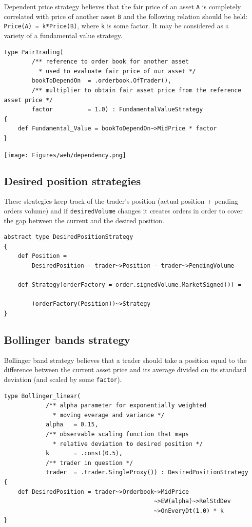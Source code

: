 \documentclass[a4paper,11pt]{article}
\begin{document}
Dependent price strategy believes that the fair price of an asset
\texttt{A} is completely correlated with price of another asset
\texttt{B} and the following relation should be held:
\texttt{Price(A) = k*Price(B)}, where \texttt{k} is some factor. It may
be considered as a variety of a fundamental value strategy.

\begin{verbatim}
type PairTrading(
        /** reference to order book for another asset
          * used to evaluate fair price of our asset */
        bookToDependOn  = .orderbook.OfTrader(),
        /** multiplier to obtain fair asset price from the reference asset price */
        factor          = 1.0) : FundamentalValueStrategy
{
    def Fundamental_Value = bookToDependOn~>MidPrice * factor
}
\end{verbatim}

\centerline{\texttt{[image: Figures/web/dependency.png]}}

\subsection{Desired position
strategies}\label{desired-position-strategies}

These strategies keep track of the trader's position (actual position +
pending orders volume) and if \texttt{desiredVolume} changes it creates
orders in order to cover the gap between the current and the desired
position.

\begin{verbatim}
abstract type DesiredPositionStrategy
{
    def Position = 
        DesiredPosition - trader~>Position - trader~>PendingVolume

    def Strategy(orderFactory = order.signedVolume.MarketSigned()) =
    
        (orderFactory(Position))~>Strategy
}
\end{verbatim}

\subsection{Bollinger bands strategy}\label{bollinger-bands-strategy}

Bollinger band strategy believes that a trader should take a position
equal to the difference between the current asset price and its average
divided on its standard deviation (and scaled by some \texttt{factor}).

\begin{verbatim}
type Bollinger_linear(
            /** alpha parameter for exponentially weighted
              * moving everage and variance */
            alpha   = 0.15,
            /** observable scaling function that maps
              * relative deviation to desired position */
            k       = .const(0.5),
            /** trader in question */
            trader  = .trader.SingleProxy()) : DesiredPositionStrategy
{
    def DesiredPosition = trader~>Orderbook~>MidPrice
                                           ~>EW(alpha)~>RelStdDev
                                           ~>OnEveryDt(1.0) * k
}
\end{verbatim}
\end{document}
